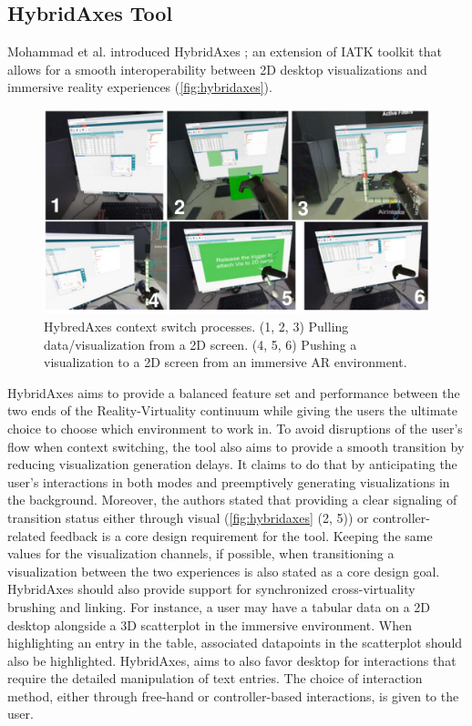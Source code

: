 \documentclass{vgtc}                          %
\begin{document}
\subsection{HybridAxes Tool}
Mohammad et al. introduced HybridAxes \cite{hybridaxes_tool}; an extension of
IATK toolkit that allows for a smooth interoperability between 2D desktop
visualizations and immersive reality experiences (\autoref{fig:hybridaxes}).

\medskip

\begin{figure}[tb]
	\centering
	\includegraphics[width=\columnwidth]{hybridaxes}
	\caption[Caption for RagRug]{HybredAxes context switch processes. (1, 2, 3)
		Pulling data/visualization from a 2D screen. (4, 5, 6) Pushing a
		visualization to a 2D screen from an immersive AR environment.}
	\label{fig:hybridaxes}
\end{figure}

\noindent HybridAxes aims to provide a balanced feature set and performance
between the two ends of the Reality-Virtuality continuum while giving the users
the ultimate choice to choose which environment to work in. To avoid
disruptions of the user's flow when context switching, the tool also aims to
provide a smooth transition by reducing visualization generation delays. It
claims to do that by anticipating the user's interactions in both modes and
preemptively generating
visualizations in the background. Moreover, the authors stated that providing
a clear signaling of transition status either through visual (\autoref{fig:hybridaxes} (2, 5)) or
controller-related feedback is a core design requirement for the tool.
Keeping the same values for the visualization channels, if possible, when
transitioning a visualization between the two experiences is also stated as
a core design goal. HybridAxes should also provide support for synchronized
cross-virtuality brushing and linking. For instance, a user may have a tabular
data on a 2D desktop alongside a 3D scatterplot in the immersive environment.
When highlighting an entry in the table, associated datapoints in the
scatterplot should also be highlighted. HybridAxes, aims to also favor desktop
for interactions that require the detailed manipulation of text entries. The
choice of interaction method, either through free-hand or
controller-based interactions, is given to the user.
\end{document}
